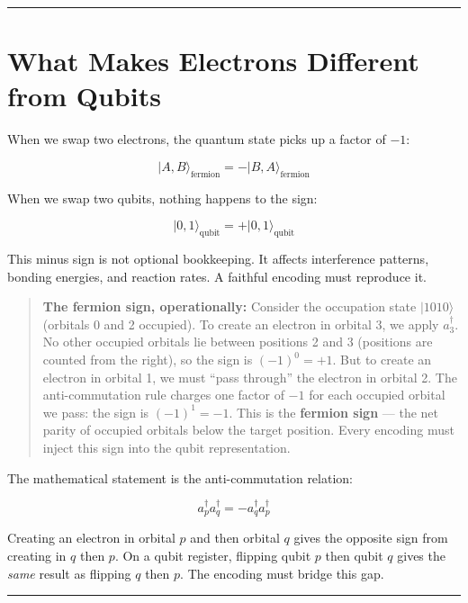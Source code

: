 \documentclass[
  11pt,
  oneside]{book}
\begin{document}
\begin{center}\rule{0.5\linewidth}{0.5pt}\end{center}

\section{What Makes Electrons Different from
Qubits}\label{what-makes-electrons-different-from-qubits}

When we swap two electrons, the quantum state picks up a factor of
\(-1\):

\[\lvert A, B\rangle_{\text{fermion}} = -\lvert B, A\rangle_{\text{fermion}}\]

When we swap two qubits, nothing happens to the sign:

\[\lvert 0, 1\rangle_{\text{qubit}} = +\lvert 0, 1\rangle_{\text{qubit}}\]

This minus sign is not optional bookkeeping. It affects interference
patterns, bonding energies, and reaction rates. A faithful encoding must
reproduce it.

\begin{quote}
\textbf{The fermion sign, operationally:} Consider the occupation state
\(\lvert 1010\rangle\) (orbitals 0 and 2 occupied). To create an
electron in orbital 3, we apply \(a_3^\dagger\). No other occupied
orbitals lie between positions 2 and 3 (positions are counted from the
right), so the sign is \((-1)^0 = +1\). But to create an electron in
orbital 1, we must ``pass through'' the electron in orbital 2. The
anti-commutation rule charges one factor of \(-1\) for each occupied
orbital we pass: the sign is \((-1)^1 = -1\). This is the
\textbf{fermion sign} --- the net parity of occupied orbitals below the
target position. Every encoding must inject this sign into the qubit
representation.
\end{quote}

The mathematical statement is the anti-commutation relation:

\[a_p^\dagger a_q^\dagger = -a_q^\dagger a_p^\dagger\]

Creating an electron in orbital \(p\) and then orbital \(q\) gives the
opposite sign from creating in \(q\) then \(p\). On a qubit register,
flipping qubit \(p\) then qubit \(q\) gives the \emph{same} result as
flipping \(q\) then \(p\). The encoding must bridge this gap.

\begin{center}\rule{0.5\linewidth}{0.5pt}\end{center}
\end{document}
